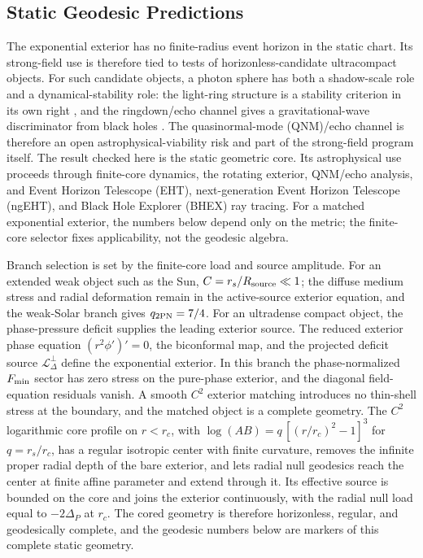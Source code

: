 \documentclass[12pt,a4paper]{article}
\begin{document}
\subsection{Static Geodesic Predictions}

The exponential exterior has no finite-radius event horizon in the static chart.
Its strong-field use is therefore tied to tests of horizonless-candidate
ultracompact objects. For such candidate objects, a photon sphere has both a
shadow-scale role and a dynamical-stability role: the light-ring structure is a
stability criterion in its own right \cite{Cunha2017}, and the ringdown/echo
channel gives a gravitational-wave discriminator from black holes
\cite{Cardoso2016}. The quasinormal-mode (QNM)/echo channel is therefore an
open astrophysical-viability risk and part of the strong-field program itself.
The result checked here is the static geometric core. Its astrophysical use
proceeds through finite-core dynamics, the rotating exterior, QNM/echo analysis,
and Event Horizon Telescope (EHT), next-generation Event Horizon Telescope
(ngEHT), and Black Hole Explorer (BHEX) ray tracing.
For a matched exponential exterior, the numbers below depend only on the metric;
the finite-core selector fixes applicability, not the geodesic algebra.

Branch selection is set by the finite-core load and source amplitude. For an extended
weak object such as the Sun,
$C=r_s/R_{\rm source}\ll 1$; the diffuse medium stress and radial deformation
remain in the active-source exterior equation, and the weak-Solar branch gives
$q_{2{\rm PN}}=7/4$. For an ultradense compact object, the phase-pressure
deficit supplies the leading exterior source. The reduced exterior phase equation
$(r^2\phi')'=0$, the biconformal map, and the projected deficit source
$\mathcal L_\Delta^\perp$ define the exponential exterior. In this branch the
phase-normalized $F_{\rm min}$ sector has zero stress on the pure-phase exterior, and the
diagonal field-equation residuals vanish. A smooth $C^2$ exterior matching
introduces no thin-shell stress at the boundary, and the matched object is a
complete geometry. The $C^2$ logarithmic core profile on $r<r_c$, with
$\log(AB)=q\,[(r/r_c)^2-1]^3$ for $q=r_s/r_c$, has a regular isotropic center
with finite curvature, removes the infinite proper radial depth of the bare
exterior, and lets radial null geodesics reach the center at finite affine
parameter and extend through it. Its effective source is bounded on the core
and joins the exterior continuously, with the radial null load equal to
$-2\Delta_P$ at $r_c$. The cored geometry is therefore horizonless, regular,
and geodesically complete, and the geodesic numbers below are markers of this
complete static geometry.
\end{document}
